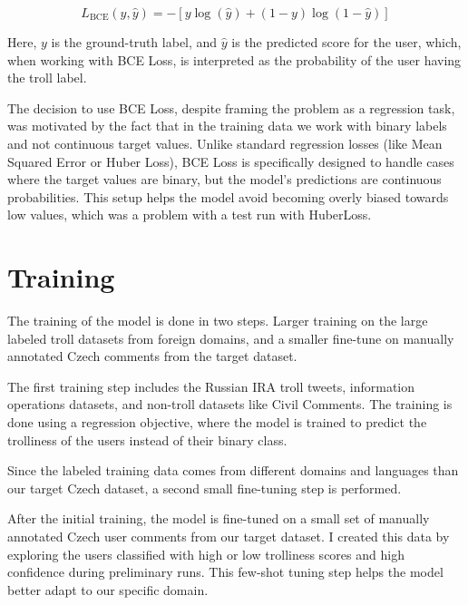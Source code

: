 \documentclass[twoside]{ctuthesis}
\theoremstyle{plain}
\theoremstyle{definition}
\theoremstyle{note}
\begin{document}
\begin{equation}
 L_{\mathrm{BCE}}(y, \hat{y}) = - \left[ y \log(\hat{y}) + (1 - y) \log(1 - \hat{y}) \right]
\end{equation}

Here, \( y \) is the ground-truth label, and \( \hat{y} \) is the predicted score for the user, which, when working with BCE Loss, is interpreted as the probability of the user having the troll label.\par


The decision to use BCE Loss, despite framing the problem as a regression task, was motivated by the fact that in the training data we work with binary labels and not continuous target values. Unlike standard regression losses (like Mean Squared Error or Huber Loss), BCE Loss is specifically designed to handle cases where the target values are binary, but the model's predictions are continuous probabilities. This setup helps the model avoid becoming overly biased towards low values, which was a problem with a test run with HuberLoss.\par 

\section{Training}
The training of the model is done in two steps. Larger training on the large labeled troll datasets from foreign domains, and a smaller fine-tune on manually annotated Czech comments from the target dataset.\par
The first training step includes the Russian IRA troll tweets, information operations datasets, and non-troll datasets like Civil Comments. The training is done using a regression objective, where the model is trained to predict the trolliness of the users instead of their binary class.\par
Since the labeled training data comes from different domains and languages than our target Czech dataset, a second small fine-tuning step is performed.\par

After the initial training, the model is fine-tuned on a small set of manually annotated Czech user comments from our target dataset. I created this data by exploring the users classified with high or low trolliness scores and high confidence during preliminary runs. This few-shot tuning step helps the model better adapt to our specific domain.\par
\end{document}
